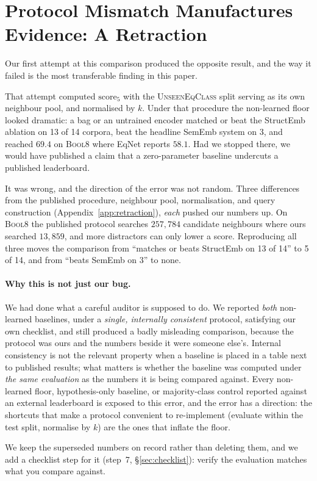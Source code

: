 \section{Protocol Mismatch Manufactures Evidence: A Retraction}
\label{sec:retraction}

Our first attempt at this comparison produced the opposite result, and the way it failed is the
most transferable finding in this paper.

That attempt computed $\mathrm{score}_5$ with the \textsc{UnseenEqClass} split serving as its own
neighbour pool, and normalised by $k$. Under that procedure the non-learned floor looked dramatic: a
bag or an untrained encoder matched or beat the StructEmb ablation on 13 of 14 corpora, beat the
headline SemEmb system on 3, and reached $69.4$ on \textsc{Bool8} where EqNet reports $58.1$. Had we
stopped there, we would have published a claim that a zero-parameter baseline undercuts a published
leaderboard.

It was wrong, and the direction of the error was not random. Three differences from the published
procedure, neighbour pool, normalisation, and query construction
(Appendix~\ref{app:retraction}), \emph{each} pushed our numbers up. On \textsc{Bool8} the
published protocol searches $257{,}784$ candidate neighbours where ours searched $13{,}859$, and
more distractors can only lower a score. Reproducing all three moves the comparison from ``matches
or beats StructEmb on 13 of 14'' to 5 of 14, and from ``beats SemEmb on 3'' to none.

\paragraph{Why this is not just our bug.} We had done what a careful auditor is supposed to do. We
reported \emph{both} non-learned baselines, under a \emph{single, internally consistent}
protocol, satisfying our own checklist, and still produced a badly misleading comparison,
because the protocol was ours and the numbers beside it were someone else's. Internal consistency
is not the relevant property when a baseline is placed in a table next to published results; what
matters is whether the baseline was computed under \emph{the same evaluation} as the numbers it is
being compared against. Every non-learned floor, hypothesis-only baseline, or majority-class
control reported against an external leaderboard is exposed to this error, and the error has a
direction: the shortcuts that make a protocol convenient to re-implement (evaluate within the
test split, normalise by $k$) are the ones that inflate the floor.

We keep the superseded numbers on record rather than deleting them, and we add a checklist step for
it (step~7, \S\ref{sec:checklist}): verify the evaluation matches what you compare against.
